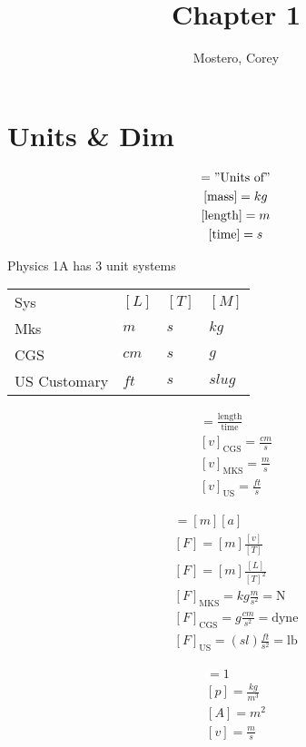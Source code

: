 \documentclass[titlepage]{article}
\title{Chapter 1}
\author{Mostero, Corey}
\begin{document}
\maketitle

\tableofcontents

\section{Units \& Dim}

\begin{gather}
    [\cdots] = "\text{Units of}" \\
    [\text{mass}] = kg \\
    [\text{length}] = m \\
    [\text{time}] = s
\end{gather}

\bigskip
Physics 1A has 3 unit systems \\
\begin{tabular}{ l | l | l | l }
    \hline
    Sys & $[L]$ & $[T]$ & $[M]$ \\
    Mks & $m$ & $s$ & $kg$ \\
    CGS & $cm$ & $s$ & $g$ \\
    US Customary & $ft$ & $s$ & $slug$ \\
\end{tabular}
\bigskip

\begin{gather}
    [v] = \frac{\text{length}}{\text{time}} \\
    [v]_{\text{CGS}} = \frac{cm}{s} \\
    [v]_{\text{MKS}} = \frac{m}{s} \\
    [v]_{\text{US}} = \frac{ft}{s}
\end{gather}

\begin{gather}
    [F] = [m] [a] \\
    [F] = [m] \frac{[v]}{[T]} \\
    [F] = [m] \frac{[L]}{[T]^{2}} \\
    [F]_{\text{MKS}} = kg \frac{m}{s^{2}} = \text{N} \\
    [F]_{\text{CGS}} = g \frac{cm}{s^{2}} = \text{dyne} \\
    [F]_{\text{US}} = (sl) \frac{ft}{s^{2}} = \text{lb}
\end{gather}

\begin{gather}
    [C] = 1 \\
    [p] = \frac{kg}{m^{3}} \\
    [A] = m^{2} \\
    [v] = \frac{m}{s}
\end{gather}
\end{document}
